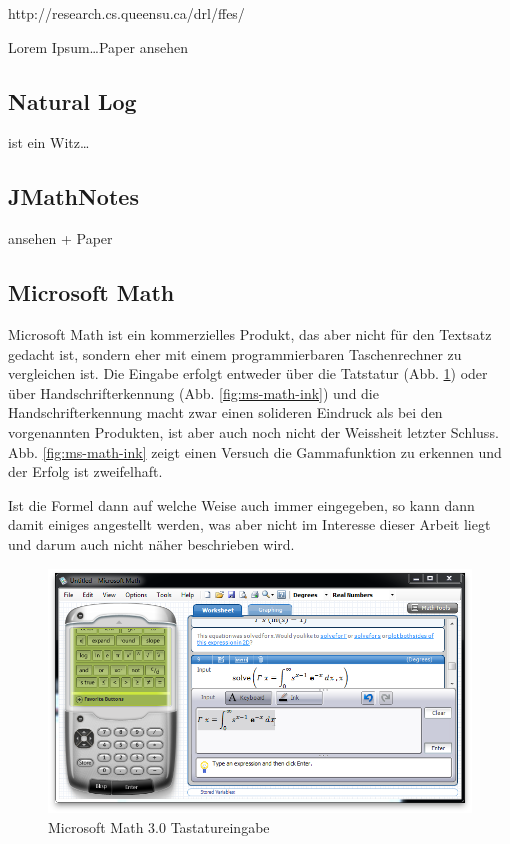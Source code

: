 http://research.cs.queensu.ca/drl/ffes/

Lorem Ipsum\dots \TODO Paper ansehen

\subsection{Natural Log}

\TODO ist ein Witz\dots 

\subsection{JMathNotes}

\TODO ansehen + Paper

\subsection{Microsoft Math}

Microsoft Math ist ein kommerzielles Produkt, das aber nicht für den Textsatz gedacht ist, sondern eher mit einem programmierbaren Taschenrechner zu vergleichen ist. Die Eingabe erfolgt entweder über die Tatstatur (Abb. \ref{fig:ms-math-keyboard}) oder über Handschrifterkennung (Abb. \ref{fig:ms-math-ink}) und die Handschrifterkennung macht zwar einen solideren Eindruck als bei den vorgenannten Produkten, ist aber auch noch nicht der Weissheit letzter Schluss. Abb. \ref{fig:ms-math-ink} zeigt einen Versuch die Gammafunktion zu erkennen und der Erfolg ist zweifelhaft.

Ist die Formel dann auf welche Weise auch immer eingegeben, so kann dann damit einiges angestellt werden, was aber nicht im Interesse dieser Arbeit liegt und darum auch nicht näher beschrieben wird.

\begin{figure}
  \begin{center}
    \includegraphics[width=\textwidth]{figures/ms-math-keyboard.png}
  \end{center}
  \caption{Microsoft Math 3.0 Tastatureingabe}
  \label{fig:ms-math-keyboard}
\end{figure}

